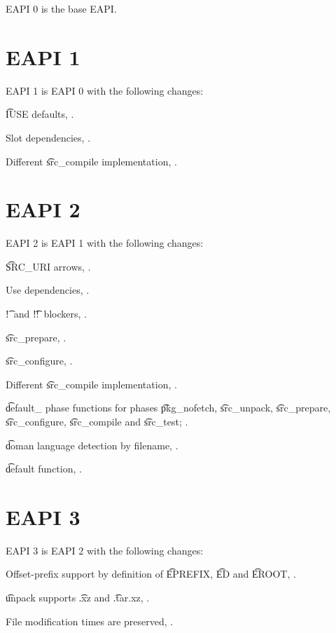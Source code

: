 EAPI 0 is the base EAPI.

\section{EAPI 1}

EAPI 1 is EAPI 0 with the following changes:

\begin{compactitem}
\item \t{IUSE} defaults, .
\item Slot dependencies, .
\item Different \t{src_compile} implementation, .
\end{compactitem}

\section{EAPI 2}

EAPI 2 is EAPI 1 with the following changes:

\begin{compactitem}
\item \t{SRC_URI} arrows, .
\item Use dependencies, .
\item \t{!}\ and \t{!!}\ blockers, .
\item \t{src_prepare}, .
\item \t{src_configure}, .
\item Different \t{src_compile} implementation, .
\item \t{default_} phase functions for phases \t{pkg_nofetch}, \t{src_unpack}, \t{src_prepare},
    \t{src_configure}, \t{src_compile} and \t{src_test}; .
\item \t{doman} language detection by filename, .
\item \t{default} function, .
\end{compactitem}

\section{EAPI 3}

EAPI 3 is EAPI 2 with the following changes:
\begin{compactitem}
\item Offset-prefix support by definition of \t{EPREFIX}, \t{ED} and \t{EROOT},
    .
\item \t{unpack} supports \t{.xz} and \t{.tar.xz}, .
\item File modification times are preserved, .
\end{compactitem}


